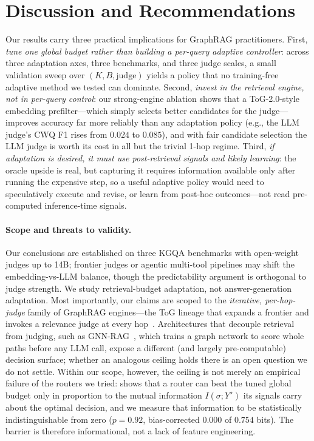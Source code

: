 \section{Discussion and Recommendations}
\label{sec:discussion}

Our results carry three practical implications for GraphRAG practitioners. First, \emph{tune one global budget rather than building a per-query adaptive controller}: across three adaptation axes, three benchmarks, and three judge scales, a small validation sweep over $(K,B,\text{judge})$ yields a policy that no training-free adaptive method we tested can dominate. Second, \emph{invest in the retrieval engine, not in per-query control}: our strong-engine ablation shows that a ToG-2.0-style embedding prefilter---which simply selects better candidates for the judge---improves accuracy far more reliably than any adaptation policy (e.g., the LLM judge's CWQ F1 rises from $0.024$ to $0.085$), and with fair candidate selection the LLM judge is worth its cost in all but the trivial 1-hop regime. Third, \emph{if adaptation is desired, it must use post-retrieval signals and likely learning}: the oracle upside is real, but capturing it requires information available only after running the expensive step, so a useful adaptive policy would need to speculatively execute and revise, or learn from post-hoc outcomes---not read pre-computed inference-time signals.

\paragraph{Scope and threats to validity.}
Our conclusions are established on three KGQA benchmarks with open-weight judges up to 14B; frontier judges or agentic multi-tool pipelines may shift the embedding-vs-LLM balance, though the predictability argument is orthogonal to judge strength. We study retrieval-budget adaptation, not answer-generation adaptation. Most importantly, our claims are scoped to the \emph{iterative, per-hop-judge} family of GraphRAG engines---the ToG lineage that expands a frontier and invokes a relevance judge at every hop~\cite{sun2023thinkongraph,ma2024thinkongraph,sun2025searchongraph}. Architectures that decouple retrieval from judging, such as GNN-RAG~\cite{mavromatis2025gnnrag}, which trains a graph network to score whole paths before any LLM call, expose a different (and largely pre-computable) decision surface; whether an analogous ceiling holds there is an open question we do not settle. Within our scope, however, the ceiling is not merely an empirical failure of the routers we tried:  shows that a router can beat the tuned global budget only in proportion to the mutual information $I(\sigma;Y^\star)$ its signals carry about the optimal decision, and we measure that information to be statistically indistinguishable from zero ($p{=}0.92$, bias-corrected $0.000$ of $0.754$ bits). The barrier is therefore informational, not a lack of feature engineering.

